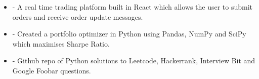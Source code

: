 
\begin{cvparagraph}
  \begin{itemize}[leftmargin=2ex, nosep, noitemsep]
    \item { - A real time trading platform built in React which allows the user to submit orders and
      receive order update messages.}
    \item { - Created a portfolio optimizer in Python using Pandas, NumPy and SciPy which maximises Sharpe Ratio.}
    \item { - Github repo of Python solutions to Leetcode, Hackerrank, Interview Bit and Google Foobar questions.}
  \end{itemize}
\end{cvparagraph}
